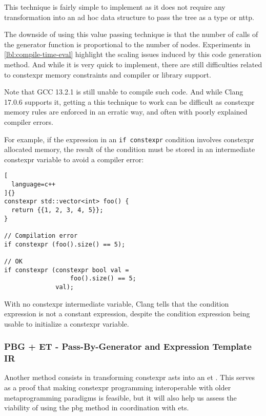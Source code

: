 \documentclass[../main]{subfiles}
\begin{document}
This technique is fairly simple to implement as it does not require any
transformation into an ad hoc data structure to pass the tree as a type
or \gls{nttp}.

The downside of using this value passing technique is that the
number of calls of the generator function is proportional to the
number of nodes. Experiments in \ref{lbl:compile-time-eval} highlight
the scaling issues induced by this code generation method.
And while it is very quick to implement, there are still difficulties
related to \gls{constexpr} memory constraints and compiler or library support.

Note that GCC 13.2.1 is still unable to compile such code.
And while Clang 17.0.6 supports it, getting a this technique to work can be
difficult as \gls{constexpr} memory rules are enforced in an erratic way,
and often with poorly explained compiler errors.

For example, if the expression in an \lstinline{if constexpr}
condition involves \gls{constexpr} allocated memory, the result of the condition
must be stored in an intermediate \gls{constexpr} variable to avoid a compiler
error:

\begin{lstlisting}[
  language=c++
]{}
constexpr std::vector<int> foo() {
  return {{1, 2, 3, 4, 5}};
}

// Compilation error
if constexpr (foo().size() == 5);

// OK
if constexpr (constexpr bool val =
                  foo().size() == 5;
              val);
\end{lstlisting}

With no \gls{constexpr} intermediate variable, Clang tells that the condition
expression is not a constant expression, despite the condition expression being
usable to initialize a \gls{constexpr} variable.

\subsubsection{
  PBG + ET - Pass-By-Generator and Expression Template IR
}

\label{lbl:pbg-et-technique}

Another method consists in transforming \gls{constexpr} \glspl{ast}
into an \acrlong{et} . This serves as a proof that making
\gls{constexpr} programming interoperable with older metaprogramming
paradigms is feasible, but it will also help us assess the viability
of using the \gls{pbg} method in coordination with \glspl{et}.
\end{document}

